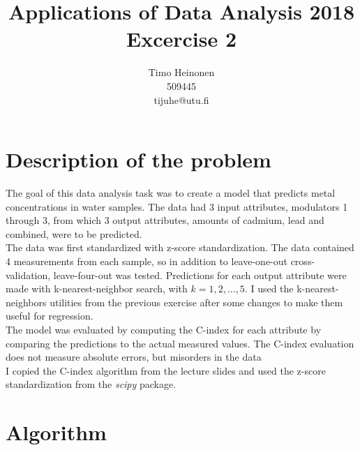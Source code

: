 \documentclass[a4paper]{article}
\title{Applications of Data Analysis 2018\\Excercise 2}
\author{Timo Heinonen\\509445\\tijuhe@utu.fi}
\begin{document}
\maketitle

\section{Description of the problem}
The goal of this data analysis task was to create a model that predicts metal concentrations in water samples. The data had 3 input attributes, modulators 1 through 3, from which 3 output attributes, amounts of cadmium, lead and combined, were to be predicted. \\

The data was first standardized with z-score standardization. The data contained 4 measurements from each sample, so in addition to leave-one-out cross-validation, leave-four-out was tested. Predictions for each output attribute were made with k-nearest-neighbor search, with $k = 1,2,...,5$. I used the k-nearest-neighbors utilities from the previous exercise after some changes to make them useful for regression. \\

The model was evaluated by computing the C-index for each attribute by comparing the predictions to the actual measured values. The C-index evaluation does not measure absolute errors, but misorders in the data 
\\

I copied the C-index algorithm from the lecture slides and used the z-score standardization from the \emph{scipy} package.

\section{Algorithm}
\end{document}
